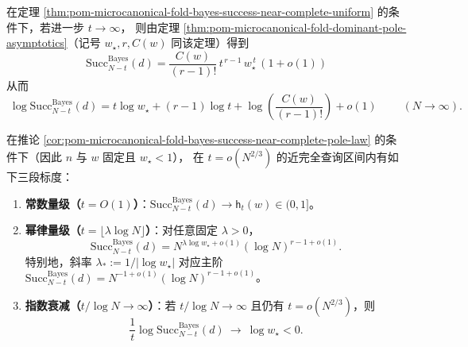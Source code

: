 \begin{corollary}[近完全查询的主指数与约化常数]\label{cor:pom-microcanonical-fold-bayes-success-near-complete-pole-law}
在定理 \ref{thm:pom-microcanonical-fold-bayes-success-near-complete-uniform} 的条件下，若进一步 \(t\to\infty\)，
则由定理 \ref{thm:pom-microcanonical-fold-dominant-pole-asymptotics}（记号 \(w_\star,r,C(w)\) 同该定理）得到
\[
\boxed{\;
\mathrm{Succ}^{\mathrm{Bayes}}_{N-t}(d)
=\frac{C(w)}{(r-1)!}\,t^{\,r-1}\,w_\star^{\,t}\,(1+o(1))\;}
\]
从而
\[
\boxed{\;
\log \mathrm{Succ}^{\mathrm{Bayes}}_{N-t}(d)
=t\log w_\star+(r-1)\log t+\log\!\left(\frac{C(w)}{(r-1)!}\right)+o(1)\;}
\qquad(N\to\infty).
\]
\end{corollary}

\begin{corollary}[全恢复成功率的三段标度相图]\label{cor:pom-microcanonical-fold-bayes-success-phase-diagram}
在推论 \ref{cor:pom-microcanonical-fold-bayes-success-near-complete-pole-law} 的条件下（因此 \(n\) 与 \(w\) 固定且 \(w_\star<1\)），
在 \(t=o(N^{2/3})\) 的近完全查询区间内有如下三段标度：
\begin{enumerate}
  \item \textbf{常数量级（\(t=O(1)\)）}：\(\mathrm{Succ}^{\mathrm{Bayes}}_{N-t}(d)\to \mathsf{h}_t(w)\in(0,1]\)。
  \item \textbf{幂律量级（\(t=\lfloor \lambda\log N\rfloor\)）}：对任意固定 \(\lambda>0\)，
  \[
  \mathrm{Succ}^{\mathrm{Bayes}}_{N-t}(d)
  =N^{\lambda\log w_\star+o(1)}(\log N)^{r-1+o(1)}.
  \]
  特别地，斜率 \(\lambda_\ast:=1/|\log w_\star|\) 对应主阶 \(\mathrm{Succ}^{\mathrm{Bayes}}_{N-t}(d)=N^{-1+o(1)}(\log N)^{r-1+o(1)}\)。
  \item \textbf{指数衰减（\(t/\log N\to\infty\)）}：若 \(t/\log N\to\infty\) 且仍有 \(t=o(N^{2/3})\)，则
  \[
  \frac{1}{t}\log \mathrm{Succ}^{\mathrm{Bayes}}_{N-t}(d)\ \to\ \log w_\star<0.
  \]
\end{enumerate}
\end{corollary}

\endinput
